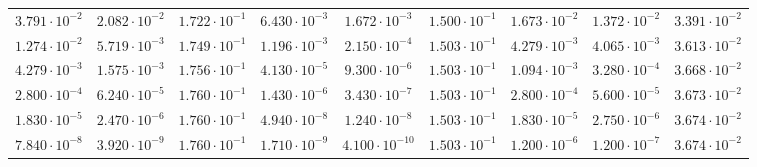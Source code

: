 \begin{table}[H]
\begin{tabular}{|ccc|ccc|ccc|}
		$3.791 \cdot 10^{-2}$                    & $2.082 \cdot 10^{-2}$                   & $1.722 \cdot 10^{-1}$                               & $6.430 \cdot 10^{-3}$  & $1.672 \cdot 10^{-3}$  & $1.500 \cdot 10^{-1}$                               & $1.673 \cdot 10^{-2}$                                                & $1.372 \cdot 10^{-2}$  & $3.391 \cdot 10^{-2}$                               \\
		$1.274 \cdot 10^{-2}$                    & $5.719 \cdot 10^{-3}$                   & $1.749 \cdot 10^{-1}$                               & $1.196 \cdot 10^{-3}$  & $2.150 \cdot 10^{-4}$  & $1.503 \cdot 10^{-1}$                               & $4.279 \cdot 10^{-3}$                                                & $4.065 \cdot 10^{-3}$  & $3.613 \cdot 10^{-2}$                               \\
		$4.279 \cdot 10^{-3}$                    & $1.575 \cdot 10^{-3}$                   & $1.756 \cdot 10^{-1}$                               & $4.130 \cdot 10^{-5}$  & $9.300 \cdot 10^{-6}$  & $1.503 \cdot 10^{-1}$                               & $1.094 \cdot 10^{-3}$                                                & $3.280 \cdot 10^{-4}$  & $3.668 \cdot 10^{-2}$                               \\
		$2.800 \cdot 10^{-4}$                    & $6.240 \cdot 10^{-5}$                   & $1.760 \cdot 10^{-1}$                               & $1.430 \cdot 10^{-6}$  & $3.430 \cdot 10^{-7}$  & $1.503 \cdot 10^{-1}$                               & $2.800 \cdot 10^{-4}$                                                & $5.600 \cdot 10^{-5}$  & $3.673 \cdot 10^{-2}$                               \\
		$1.830 \cdot 10^{-5}$                    & $2.470 \cdot 10^{-6}$                   & $1.760 \cdot 10^{-1}$                               & $4.940 \cdot 10^{-8}$  & $1.240 \cdot 10^{-8}$  & $1.503 \cdot 10^{-1}$                               & $1.830 \cdot 10^{-5}$                                                & $2.750 \cdot 10^{-6}$  & $3.674 \cdot 10^{-2}$                               \\
		$7.840 \cdot 10^{-8}$                    & $3.920 \cdot 10^{-9}$                   & $1.760 \cdot 10^{-1}$                               & $1.710 \cdot 10^{-9}$  & $4.100 \cdot 10^{-10}$ & $1.503 \cdot 10^{-1}$                               & $1.200 \cdot 10^{-6}$                                                & $1.200 \cdot 10^{-7}$  & $3.674 \cdot 10^{-2}$                               \\

\end{tabular}
\end{table}

